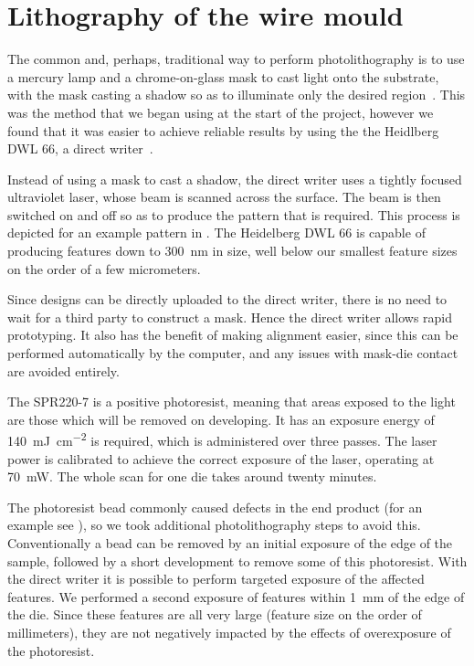\section{Lithography of the wire mould}

The common and, perhaps, traditional way to perform photolithography is to use
a mercury lamp and a chrome-on-glass mask to cast light onto the
substrate, with the mask casting a shadow so as to illuminate only the desired
region~\cite{Madou2002}. This was the method that we began using at the start of the
project, however we found that it was easier to achieve reliable results by
using the the Heidlberg DWL 66, a direct writer~\cite{}. 

Instead of using a mask to cast a shadow, the direct writer uses a tightly
focused ultraviolet laser, whose beam is scanned across the surface. The beam
is then switched on and off so as to produce the pattern that is required.
This process is depicted for an example pattern in
. The Heidelberg DWL 66 is capable of producing
features down to \SI{300}{\nano\meter} in size, well below our smallest feature
sizes on the order of a few micrometers.

Since designs can be directly uploaded to the direct writer, there is no need
to wait for a third party to construct a mask.  Hence the direct writer allows
rapid prototyping. It also has the benefit of making alignment easier, since
this can be performed automatically by the computer, and any issues with
mask-die contact are avoided entirely. 

The SPR220-7 is a positive photoresist, meaning that areas exposed to the light
are those which will be removed on developing. It has an exposure energy of
\SI{140}{\milli\joule\per\square\centi\meter} is required, which is
administered over three passes. The laser power is calibrated to achieve the
correct exposure of the laser, operating at \SI{70}{\milli\watt}. The
whole scan for one die takes around twenty minutes.

The photoresist bead commonly caused defects in the end product (for an
example see ), so  we took additional photolithography
steps to avoid this. Conventionally a bead can be removed by an initial 
exposure of the edge of the sample, followed by a short development to remove
some of this photoresist. With the direct writer it is possible to perform
targeted exposure of the affected features. We performed a second exposure of
features within \SI{1}{\milli\meter} of the edge of the die. Since these
features are all very large (feature size on the order of millimeters), they
are not negatively impacted by the effects of overexposure of the photoresist.

